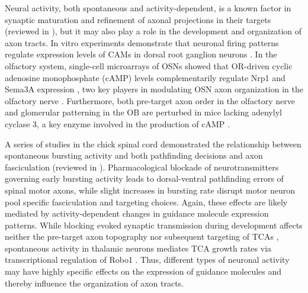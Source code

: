 \label{sec:Intrinsic2}
Neural activity, both spontaneous and activity-dependent, is a known factor in synaptic maturation and refinement of axonal projections in their targets (reviewed in \cite{zhang2001electrical}), but it may also play a role in the development and organization of axon tracts.
In vitro experiments demonstrate that neuronal firing patterns regulate expression levels of CAMs in dorsal root ganglion neurons \cite{itoh1997activity}.
In the olfactory system, single-cell microarrays of OSNs showed that OR-driven cyclic adenosine monophosphate (cAMP) levels complementarily regulate Nrp1 and Sema3A expression \cite{imai2006odorant}, two key players in modulating OSN axon organization in the olfactory nerve \cite{imai2009pre}.
Furthermore, both pre-target axon order in the olfactory nerve and glomerular patterning in the OB are perturbed in mice lacking adenylyl cyclase 3, a key enzyme involved in the production of cAMP \cite{miller2010axon}.

A series of studies in the chick spinal cord demonstrated the relationship between spontaneous bursting activity and both pathfinding decisions and axon fasciculation (reviewed in \cite{hanson2008spontaneous}).
Pharmacological blockade of neurotransmitters governing early bursting activity leads to dorsal-ventral pathfinding errors of spinal motor axons, while slight increases in bursting rate disrupt motor neuron pool specific fasciculation and targeting choices.
Again, these effects are likely mediated by activity-dependent changes in guidance molecule expression patterns.
While blocking evoked synaptic transmission during development affects neither the pre-target axon topography nor subsequent targeting of TCAs \cite{molnar2002normal}, spontaneous activity in thalamic neurons mediates TCA growth rates via transcriptional regulation of Robo1 \cite{mire2012spontaneous}.
Thus, different types of neuronal activity may have highly specific effects on the expression of guidance molecules and thereby influence the organization of axon tracts.